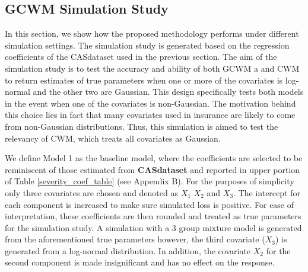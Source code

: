 \documentclass[12pt,letterpaper]{article}
\numberwithin{equation}{section}
\numberwithin{equation}{section}
\numberwithin{equation}{section}
\begin{document}
\subsection{GCWM Simulation Study}


In this section, we show how the proposed methodology performs under different simulation settings. The simulation study is generated based on the regression coefficients of the CASdataset used in the previous section. The aim of the simulation study is to test the accuracy and ability of both GCWM a and CWM to return estimates of true parameters when one or more of the covariates is log-normal and the other two are Gaussian. This design specifically tests both models in the event when one of the covariates is non-Gaussian. The motivation behind this choice lies in fact that many covariates used in insurance are likely to come from non-Gaussian distributions. Thus, this simulation is aimed to test the relevancy of CWM, which treats all covariates as Gaussian.

We define Model 1 as the baseline model, where the coefficients are selected to be reminiscent of those estimated from \textbf{CASdataset} and reported in upper portion of Table \ref{severity_coef_table} (see Appendix B). For the purposes of simplicity only three covariates are chosen and denoted as $X_1$ $X_2$ and $X_3$. The intercept for each component is increased to make sure simulated loss is positive. For ease of interpretation, these coefficients are then rounded and treated as true parameters for the simulation study.  A simulation with a 3 group mixture model is generated from the aforementioned true parameters however, the third covariate ($X_3$) is generated from a log-normal distribution.  In addition, the covariate $X_2$ for the second component is made insignificant and has no effect on the response. 
\end{document}
